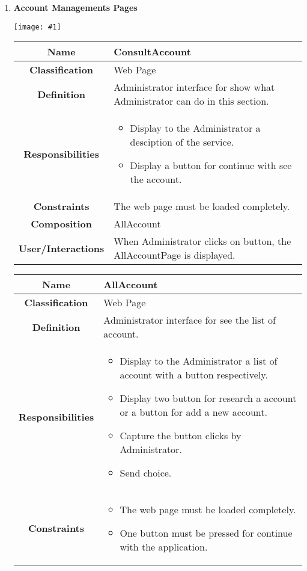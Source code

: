\documentclass[11pt, a4paper,titlepage]{article}
\newcommand{\image}[1]{
	\begin{center}
		\noindent \texttt{[image: \#1]}
	\end{center}
	}
\begin{document}
\begin{enumerate}
\newpage
\item \textbf{Account Managements Pages}\\
\image{page_accountmanagement.png}
\begin{tabularx}{\textwidth}{| c | X |}
	\hline
	\textbf{Name} &
	ConsultAccount
	\\
	\hline
	\textbf{Classification} &
	Web Page
	\\
	\hline
	\textbf{Definition} &
	Administrator interface for show what Administrator can do in this section.\\
	\hline
	\textbf{Responsibilities} &
	\begin{itemize}
		\item Display to the Administrator a desciption of the service.
		\item Display a button for continue with see the account.
	\end{itemize}
	\\
	\hline
	\textbf{Constraints} & The web page must be loaded completely.
	\\
	\hline
	\textbf{Composition} &
	AllAccount
	\\
	\hline
	\textbf{User/Interactions} &
	When Administrator clicks on button, the AllAccountPage is displayed.
	\\
	\hline 
\end{tabularx}
\begin{tabularx}{\textwidth}{| c | X |}
	\hline
	\textbf{Name} &
	AllAccount
	\\
	\hline
	\textbf{Classification} &
	Web Page
	\\
	\hline
	\textbf{Definition} &
	Administrator interface for see the list of account.\\
	\hline
	\textbf{Responsibilities} &
	\begin{itemize}
		\item Display to the Administrator a list of account with a button respectively.
		\item Display two button for research a account or a button for add a new account.
		\item  Capture the button clicks by Administrator.
		\item Send choice.
	\end{itemize}
	\\
	\hline
	\textbf{Constraints} &
	\begin{itemize}
		\item  The web page must be loaded completely.
		\item One button must be pressed for continue with the application.

\end{itemize}
\end{tabularx}
\end{enumerate}
\end{document}
